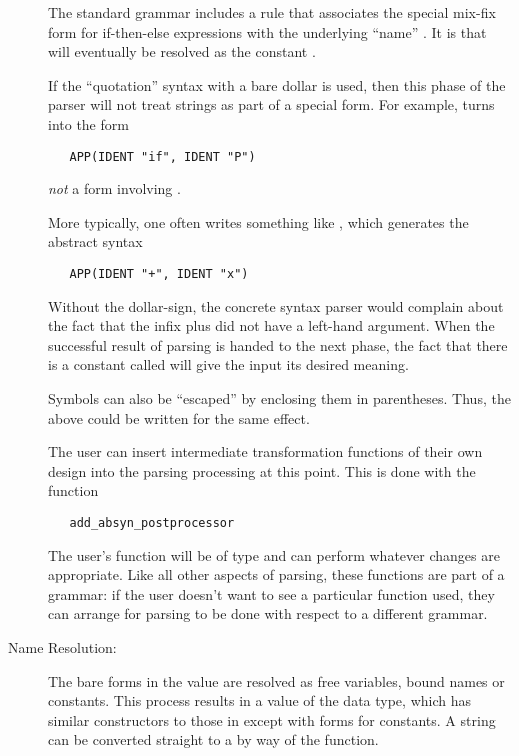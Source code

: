 \begin{description}
  The standard grammar includes a rule that associates the special
  mix-fix form for if-then-else expressions with the underlying
  ``name'' .  It is  that will eventually be
  resolved as the constant .

  If the ``quotation'' syntax with a bare dollar is used,%
%
%
%
then this phase of the parser will not treat strings as part of a
special form.  For example,  turns into
the  form
\begin{verbatim}
   APP(IDENT "if", IDENT "P")
\end{verbatim}
  \emph{not} a form involving .

  More typically, one often writes something like
  , which generates the abstract syntax
\begin{verbatim}
   APP(IDENT "+", IDENT "x")
\end{verbatim}
  Without the dollar-sign, the concrete syntax parser would complain
  about the fact that the infix plus did not have a left-hand
  argument.  When the successful result of parsing is handed to the
  next phase, the fact that there is a constant called \holtxt{+} will
  give the input its desired meaning.

  Symbols can also be ``escaped'' by enclosing them in parentheses.
  Thus, the above could be written  for the
  same effect.

  The user can insert intermediate transformation functions of their
  own design into the parsing processing at this point.  This is done
  with the function
\begin{verbatim}
   add_absyn_postprocessor
\end{verbatim}
  The user's function will be of type  and can
  perform whatever changes are appropriate.  Like all other aspects of
  parsing, these functions are part of a grammar: if the user doesn't
  want to see a particular function used, they can arrange for parsing
  to be done with respect to a different grammar.

\item[Name Resolution:] The bare  forms in the 
  value are resolved as free variables, bound names or constants.
  This process results in a value of the  data type, which
  has similar constructors to those in  except with forms
  for constants. %
  A string can be converted straight to a  by way of the
   function.


\end{description}
